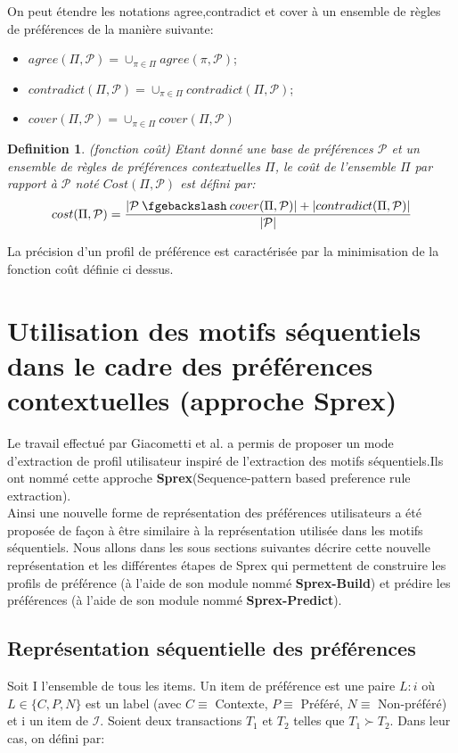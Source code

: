 \documentclass[a4paper,12pt,openany,oneside]{article}
\newcommand{\mysetminus}{\mathbin{\fgebackslash}}
\newtheorem{defn}{Definition} %
\begin{document}
	On peut étendre les notations agree,contradict et cover à un ensemble de règles de préférences de la manière suivante:\\
	\begin{itemize}
		\item $agree(\Pi,\mathcal{P})=\cup_{\pi \in \Pi} agree(\pi,\mathcal{P})$;
		\item $contradict(\Pi,\mathcal{P}) =\cup_{\pi\in\Pi}contradict(\Pi,\mathcal{P})$;
		\item $cover(\Pi,\mathcal{P})=\cup_{\pi\in\Pi}cover(\Pi,\mathcal{P})$\\
	\end{itemize}


\begin{defn}(fonction coût)
Etant donné une base de préférences $\mathcal{P}$ et un ensemble de règles de préférences contextuelles $\Pi$, le coût de l'ensemble $\Pi$ par rapport à $\mathcal{P}$ noté $Cost(\Pi,\mathcal{P})$ est défini par:
\[
cost(\Pi,\mathcal{P})=\frac{|\mathcal{P}\mysetminus cover(\Pi,\mathcal{P})|+|contradict(\Pi,\mathcal{P})|}{|\mathcal{P}|}
\]
\end{defn}
La précision d'un profil de préférence est caractérisée par la minimisation de la fonction coût définie ci dessus.

\section{Utilisation des motifs séquentiels dans le cadre des préférences contextuelles (approche Sprex)}

Le travail effectué par  Giacometti et al. a permis de proposer un mode d'extraction de profil utilisateur inspiré de l'extraction des motifs séquentiels.Ils ont nommé cette approche \textbf{Sprex}(Sequence-pattern based preference rule extraction).\\
Ainsi une nouvelle forme de représentation des préférences utilisateurs a été proposée de façon à être similaire à la représentation utilisée dans les motifs séquentiels.
Nous allons dans les sous sections suivantes décrire cette nouvelle représentation et les différentes étapes de Sprex qui permettent de construire les profils de préférence (à l'aide de son module nommé \textbf{Sprex-Build}) et prédire les préférences (à l'aide de son module nommé \textbf{Sprex-Predict}). 

\subsection{Représentation séquentielle des préférences}
Soit I l'ensemble de tous les items. Un item de préférence est une paire $L:i$ où $L\in \{C,P,N\}$ est un label (avec $C\equiv $ Contexte, $P\equiv $ Préféré, $N\equiv $ Non-préféré) et i un item de $\mathcal{I}$.
Soient deux transactions $T_1$ et $T_2$ telles que $T_1\succ T_2$. Dans leur cas, on défini par:
\end{document}

